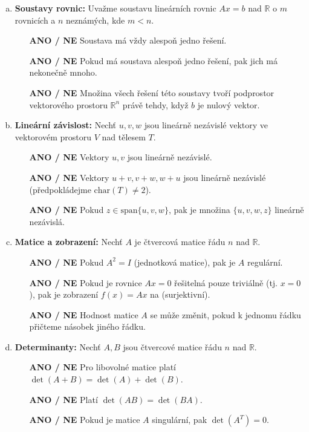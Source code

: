 \documentclass[a4paper,11pt]{article}
\begin{document}
\begin{enumerate}[(a)]
    \item \textbf{Soustavy rovnic:} Uvažme soustavu lineárních rovnic $Ax=b$ nad $\mathbb{R}$ o $m$ rovnicích a $n$ neznámých, kde $m < n$.
    \begin{itemize}
        \item[\textbf{ANO / NE}] Soustava má vždy alespoň jedno řešení.
        \item[\textbf{ANO / NE}] Pokud má soustava alespoň jedno řešení, pak jich má nekonečně mnoho.
        \item[\textbf{ANO / NE}] Množina všech řešení této soustavy tvoří podprostor vektorového prostoru $\mathbb{R}^n$ právě tehdy, když $b$ je nulový vektor.
    \end{itemize}

    \item \textbf{Lineární závislost:} Nechť $u, v, w$ jsou lineárně nezávislé vektory ve vektorovém prostoru $V$ nad tělesem $T$.
    \begin{itemize}
        \item[\textbf{ANO / NE}] Vektory $u, v$ jsou lineárně nezávislé.
        \item[\textbf{ANO / NE}] Vektory $u+v, v+w, w+u$ jsou lineárně nezávislé (předpokládejme $\text{char}(T) \neq 2$).
        \item[\textbf{ANO / NE}] Pokud $z \in \text{span}\{u, v, w\}$, pak je množina $\{u, v, w, z\}$ lineárně nezávislá.
    \end{itemize}

    \item \textbf{Matice a zobrazení:} Nechť $A$ je čtvercová matice řádu $n$ nad $\mathbb{R}$.
    \begin{itemize}
        \item[\textbf{ANO / NE}] Pokud $A^2 = I$ (jednotková matice), pak je $A$ regulární.
        \item[\textbf{ANO / NE}] Pokud je rovnice $Ax=0$ řešitelná pouze triviálně (tj. $x=0$), pak je zobrazení $f(x) = Ax$ na (surjektivní).
        \item[\textbf{ANO / NE}] Hodnost matice $A$ se může změnit, pokud k jednomu řádku přičteme násobek jiného řádku.
    \end{itemize}

    \item \textbf{Determinanty:} Nechť $A, B$ jsou čtvercové matice řádu $n$ nad $\mathbb{R}$.
    \begin{itemize}
        \item[\textbf{ANO / NE}] Pro libovolné matice platí $\det(A+B) = \det(A) + \det(B)$.
        \item[\textbf{ANO / NE}] Platí $\det(AB) = \det(BA)$.
        \item[\textbf{ANO / NE}] Pokud je matice $A$ singulární, pak $\det(A^T) = 0$.
    \end{itemize}
\end{enumerate}
\end{document}
